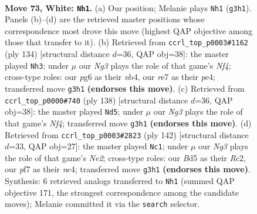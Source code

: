 \documentclass[11pt]{article}
\begin{document}
\clearpage

\begin{figure}[p]\centering
\begin{subfigure}{0.46\textwidth}\centering
\resizebox{\linewidth}{!}{%
\newchessgame
\chessboard[
  setfen={8/4rp2/n5p1/3BP2p/b4Pp1/3k2N1/5K1P/8 w - - 4 73},
  showmover=false,
  pgfstyle=straightmove, color=movearrow, markmove={g3-h1}
]}
\caption{}
\end{subfigure}\hfill
\begin{subfigure}{0.46\textwidth}\centering
\resizebox{\linewidth}{!}{%
\newchessgame
\chessboard[
  setfen={8/8/5kp1/P1p2p1p/1n2pN1P/1P4P1/3K4/8 w - - 15 68},
  showmover=false,
  pgfstyle=straightmove, color=movearrow, markmove={f4-h3}
]}
\caption{}
\end{subfigure}
\\[4pt]
\begin{subfigure}{0.46\textwidth}\centering
\resizebox{\linewidth}{!}{%
\newchessgame
\chessboard[
  setfen={8/5pk1/1pB3p1/7p/P4N1P/6P1/7K/1r6 w - - 3 70},
  showmover=false,
  pgfstyle=straightmove, color=movearrow, markmove={f4-d5}
]}
\caption{}
\end{subfigure}\hfill
\begin{subfigure}{0.46\textwidth}\centering
\resizebox{\linewidth}{!}{%
\newchessgame
\chessboard[
  setfen={8/8/4p3/1pB1p1k1/1Pn1Pp2/1r6/2R1N3/4K3 w - - 2 72},
  showmover=false,
  pgfstyle=straightmove, color=movearrow, markmove={e2-c1}
]}
\caption{}
\end{subfigure}
\caption{\textbf{Move 73, White: \texttt{Nh1}.} (a) Our position; Melanie plays \texttt{Nh1} (\texttt{g3h1}). Panels (b)--(d) are the retrieved master positions whose correspondence most drove this move (highest QAP objective among those that transfer to it). (b) Retrieved from \texttt{ccrl\_top\_p0003\#1162} (ply 134) [structural distance $d$=36, QAP obj=38]: the master played \texttt{Nh3}; under $\mu$ our \emph{Ng3} plays the role of that game's \emph{Nf4}; cross-type roles: our \emph{p}g6 as their \emph{n}b4, our \emph{r}e7 as their \emph{p}e4; transferred move \texttt{g3h1} \textbf{(endorses this move)}. (c) Retrieved from \texttt{ccrl\_top\_p0000\#740} (ply 138) [structural distance $d$=36, QAP obj=38]: the master played \texttt{Nd5}; under $\mu$ our \emph{Ng3} plays the role of that game's \emph{Nf4}; transferred move \texttt{g3h1} \textbf{(endorses this move)}. (d) Retrieved from \texttt{ccrl\_top\_p0003\#2823} (ply 142) [structural distance $d$=33, QAP obj=27]: the master played \texttt{Nc1}; under $\mu$ our \emph{Ng3} plays the role of that game's \emph{Ne2}; cross-type roles: our \emph{B}d5 as their \emph{R}c2, our \emph{p}f7 as their \emph{n}c4; transferred move \texttt{g3h1} \textbf{(endorses this move)}. Synthesis: 6 retrieved analogs transferred to \texttt{Nh1} (summed QAP objective 171, the strongest correspondence among the candidate moves); Melanie committed it via the \texttt{search} selector.}
\label{fig:thought-m144}
\end{figure}
\end{document}
